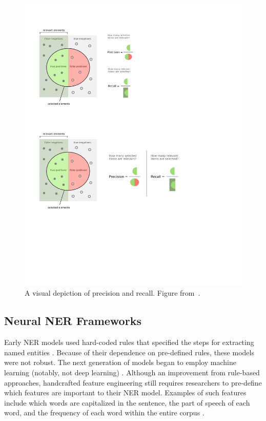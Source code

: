 \begin{figure}[h]
	\centering
	\includegraphics[width=0.85\linewidth]{LatexDiss/figures/evaluationmetrics.pdf}
	\caption{A visual depiction of precision and recall. Figure from~\citep{NERevaluationmetrics}.}
	\label{fig:evaluationmetrics}
\end{figure}



\subsection{Neural NER Frameworks}
\label{sec:neuralNER}
Early NER models used hard-coded rules that specified the steps for extracting named entities \citep{NeuralNERSurvey}. Because of their dependence on pre-defined rules, these models were not robust. The next generation of models began to employ machine learning (notably, not deep learning) \citep{NeuralNERSurvey}. Although an improvement from rule-based approaches, handcrafted feature engineering still requires researchers to pre-define which features are important to their NER model. Examples of such features include which words are capitalized in the sentence, the part of speech of each word, and the frequency of each word within the entire corpus \citep{2007Survey}.

